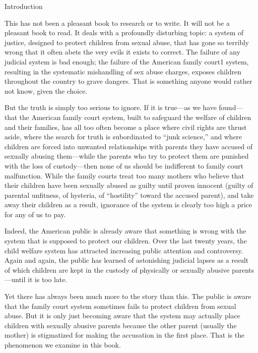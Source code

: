 
Introduction \pfl{}


This has not been a pleasant book to research or to write. It will not be a pleasant book to read. It deals with a profoundly disturbing topic: a system of justice, designed to protect children from sexual abuse, that has gone so terribly wrong that it often abets the very evils it exists to correct. The failure of any judicial system is bad enough; the failure of the American family court1 system, resulting in the systematic mishandling of sex abuse charges, exposes children throughout the country to grave dangers. That is something anyone would rather not know, given the choice. \pfl{}


But the truth is simply too serious to ignore. If it is true—as we have found—that the American family court system, built to safeguard the welfare of children and their families, has all too often become a place where civil rights are thrust aside, where the search for truth is subordinated to “junk science,” and where children are forced into unwanted relationships with parents they have accused of sexually abusing them—while the parents who try to protect them are punished with the loss of custody—then none of us should be indifferent to family court malfunction. While the family courts treat too many mothers who believe that their children have been sexually abused as guilty until proven innocent (guilty of parental unfitness, of hysteria, of “hostility” toward the accused parent), and take away their children as a result, ignorance of the system is clearly too high a price for any of us to pay. \pfl{}



Indeed, the American public is already aware that something is wrong with the system that is supposed to protect our children. Over the last twenty years, the child welfare system has attracted increasing public attention and controversy. Again and again, the public has learned of astonishing judicial lapses as a result of which children are kept in the custody of physically or sexually abusive parents—until it is too late. \pfl{}


Yet there has always been much more to the story than this. The public is aware that the family court system sometimes fails to protect children from sexual abuse. But it is only just becoming aware that the system may actually place children with sexually abusive parents because the other parent (usually the mother) is stigmatized for making the accusation in the first place. That is the phenomenon we examine in this book. \pfl{}


